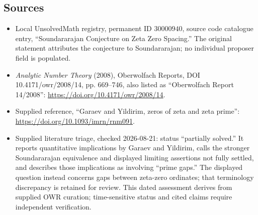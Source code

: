 \documentclass[11pt]{article}
\begin{document}
\subsection{Sources}
\begin{itemize}
\item Local UnsolvedMath registry, permanent ID \(30000940\), source code catalogue entry, ``Soundararajan Conjecture on Zeta Zero Spacing.'' The original statement attributes the conjecture to Soundararajan; no individual proposer field is populated.
\item \emph{Analytic Number Theory} (2008), Oberwolfach Reports, DOI 10.4171/owr/2008/14, pp. 669--746, also listed as ``Oberwolfach Report 14/2008'': \url{https://doi.org/10.4171/owr/2008/14}.
\item Supplied reference, ``Garaev and Yildirim, zeros of zeta and zeta prime'': \url{https://doi.org/10.1093/imrn/rnm091}.
\item Supplied literature triage, checked 2026-08-21: status ``partially solved.'' It reports quantitative implications by Garaev and Yildirim, calls the stronger Soundararajan equivalence and displayed limiting assertions not fully settled, and describes those implications as involving ``prime gaps.'' The displayed question instead concerns gaps between zeta-zero ordinates; that terminology discrepancy is retained for review. This dated assessment derives from supplied OWR curation; time-sensitive status and cited claims require independent verification.
\end{itemize}
\end{document}
